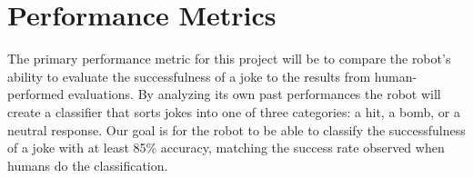 \documentclass[onecolumn, draftclsnofoot,10pt, compsoc]{IEEEtran}
\begin{document}
\section{Performance Metrics}
The primary performance metric for this project will be to compare the robot's ability to evaluate the successfulness of a joke to the results from human-performed evaluations. By analyzing its own past performances the robot will create a classifier that sorts jokes into one of three categories: a hit, a bomb, or a neutral response. Our goal is for the robot to be able to classify the successfulness of a joke with at least 85\% accuracy, matching the success rate observed when humans do the classification.
\end{document}
